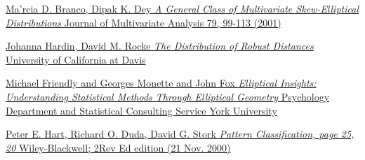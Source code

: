 \begin{thebibliography}{}
                                                                                                                                  \href{http://dmrocke.ucdavis.edu/Robdist5.pdf}{Ma'rcia D. Branco, Dipak K. Dey
                                                                                                                                  \textit{A General Class of Multivariate
                                                                                                                                  Skew-Elliptical Distributions}
                                                                                                                                  Journal of Multivariate Analysis 79, 99-113 (2001)}

                                                                                                                                  \href{http://dmrocke.ucdavis.edu/Robdist5.pdf}{Johanna Hardin, David M. Rocke
                                                                                                                                  \textit{The Distribution of Robust Distances}
                                                                                                                                  University of California at Davis}

                                                                                                                                  \href{http://datavis.ca/papers/ellipses.pdf}{Michael Friendly and Georges Monette and John Fox
                                                                                                                                  \textit{Elliptical Insights: Understanding Statistical Methods Through Elliptical Geometry}
                                                                                                                                  Psychology Department and Statistical Consulting Service York University}


                                                                                                                                  \href{}{ Peter E. Hart, Richard O. Duda, David G. Stork
                                                                                                                                  \textit{Pattern Classification, page 25, 20}
                                                                                                                                  Wiley-Blackwell; 2Rev Ed edition (21 Nov. 2000)}


\end{thebibliography}
